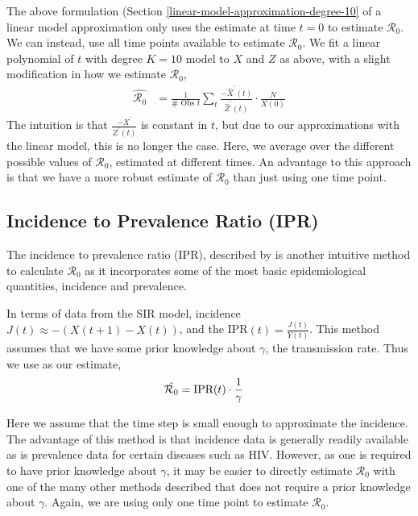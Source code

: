 \documentclass[12pt]{article}
\newcommand{\rr}{\ensuremath{\mathcal{R}_0}}
\begin{document}
The above formulation (Section \ref{linear-model-approximation-degree-10} of a linear model approximation only uses the estimate at time $t=0$ to estimate $\rr$.  We can instead, use all time points available to estimate $\rr$.  We fit a linear polynomial of \(t\) with degree \(K= 10\) model to \(X\)
and \(Z\) as above, with a slight modification in how we estimate
\(\rr\),
\begin{align*}
  \hat{\rr} &= \frac{1}{\# \text{ Obs }t} \sum_t \frac{-\hat{X}^\prime(t)}{\hat{Z}^\prime(t)} \cdot \frac{N}{X(0)} 
\end{align*}
The intuition is that $\frac{-X^\prime}{Z^\prime(t)}$ is constant in $t$, but due to our approximations with the linear model, this is no longer the case.  Here, we average over the different possible values of $\rr$, estimated at different times.  An advantage to this approach is that we have a more robust estimate of $\rr$ than just using one time point.  


\subsection{Incidence to Prevalence Ratio (IPR)}\label{incidence-to-prevalence-ratio}
The incidence to prevalence ratio (IPR), described by \cite{Nishiura2009} is another intuitive method to calculate $\rr$ as it incorporates some of the most basic epidemiological quantities, incidence and prevalence.

In terms of data from the SIR model, incidence $J(t) \approx -(X(t+1) - X(t))$, and the IPR$(t) = \frac{J(t)}{Y(t)}$.  This method assumes that we have some prior knowledge about $\gamma$, the transmission rate.  Thus we use as our estimate,
\begin{align*}
\hat{\rr} &= \textnormal{IPR}(t) \cdot \frac{1}{\gamma}
\end{align*}

Here we assume that the time step is small enough to approximate the incidence.  The advantage of this method is that incidence data is generally readily available as is prevalence data for certain diseases such as HIV.  However, as one is required to have prior knowledge about $\gamma$, it may be easier to directly estimate $\rr$ with one of the many other methods described that does not require a prior knowledge about $\gamma$.  Again, we are using only one time point to estimate $\rr$.
\end{document}
